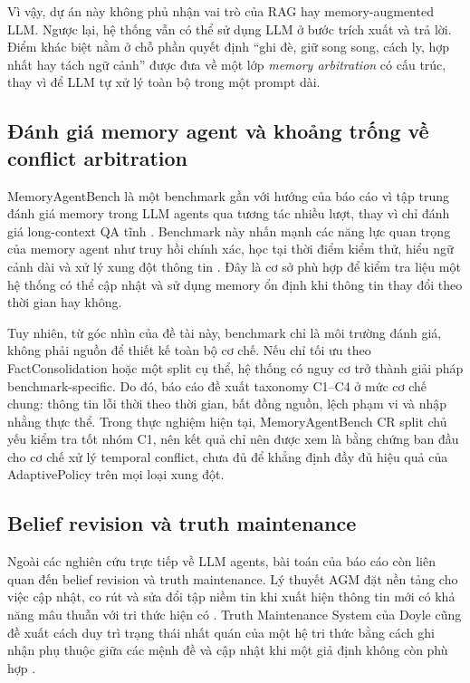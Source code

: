 \documentclass[12pt,a4paper]{article}
\begin{document}
Vì vậy, dự án này không phủ nhận vai trò của RAG hay memory-augmented LLM. Ngược lại, hệ thống vẫn có thể sử dụng LLM ở bước trích xuất và trả lời. Điểm khác biệt nằm ở chỗ phần quyết định ``ghi đè, giữ song song, cách ly, hợp nhất hay tách ngữ cảnh'' được đưa về một lớp \textit{memory arbitration} có cấu trúc, thay vì để LLM tự xử lý toàn bộ trong một prompt dài.

\subsection{Đánh giá memory agent và khoảng trống về conflict arbitration}

MemoryAgentBench là một benchmark gần với hướng của báo cáo vì tập trung đánh giá memory trong LLM agents qua tương tác nhiều lượt, thay vì chỉ đánh giá long-context QA tĩnh \cite{memoryagentbench}. Benchmark này nhấn mạnh các năng lực quan trọng của memory agent như truy hồi chính xác, học tại thời điểm kiểm thử, hiểu ngữ cảnh dài và xử lý xung đột thông tin \cite{memoryagentbench_dataset}. Đây là cơ sở phù hợp để kiểm tra liệu một hệ thống có thể cập nhật và sử dụng memory ổn định khi thông tin thay đổi theo thời gian hay không.

Tuy nhiên, từ góc nhìn của đề tài này, benchmark chỉ là môi trường đánh giá, không phải nguồn để thiết kế toàn bộ cơ chế. Nếu chỉ tối ưu theo FactConsolidation hoặc một split cụ thể, hệ thống có nguy cơ trở thành giải pháp benchmark-specific. Do đó, báo cáo đề xuất taxonomy C1--C4 ở mức cơ chế chung: thông tin lỗi thời theo thời gian, bất đồng nguồn, lệch phạm vi và nhập nhằng thực thể. Trong thực nghiệm hiện tại, MemoryAgentBench CR split chủ yếu kiểm tra tốt nhóm C1, nên kết quả chỉ nên được xem là bằng chứng ban đầu cho cơ chế xử lý temporal conflict, chưa đủ để khẳng định đầy đủ hiệu quả của AdaptivePolicy trên mọi loại xung đột.

\subsection{Belief revision và truth maintenance}

Ngoài các nghiên cứu trực tiếp về LLM agents, bài toán của báo cáo còn liên quan đến belief revision và truth maintenance. Lý thuyết AGM đặt nền tảng cho việc cập nhật, co rút và sửa đổi tập niềm tin khi xuất hiện thông tin mới có khả năng mâu thuẫn với tri thức hiện có \cite{agm1985}. Truth Maintenance System của Doyle cũng đề xuất cách duy trì trạng thái nhất quán của một hệ tri thức bằng cách ghi nhận phụ thuộc giữa các mệnh đề và cập nhật khi một giả định không còn phù hợp \cite{doyle1979}.
\end{document}
